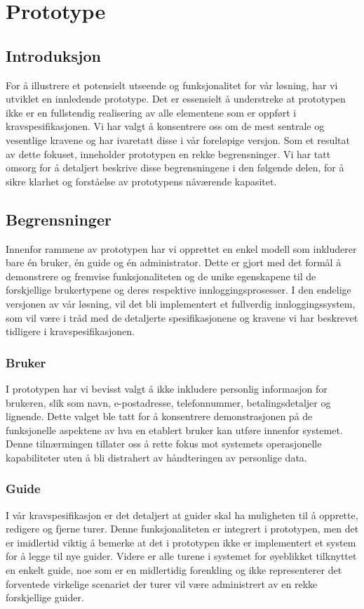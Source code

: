 \documentclass[../doc]{subfiles}
\begin{document}
\section{Prototype}
\subsection{Introduksjon}
For å illustrere et potensielt utseende og funksjonalitet for vår løsning, har vi utviklet en innledende prototype. Det er essensielt å understreke at prototypen ikke er en fullstendig realisering av alle elementene som er oppført i kravspesifikasjonen. Vi har valgt å konsentrere oss om de mest sentrale og vesentlige kravene og har ivaretatt disse i vår foreløpige versjon. Som et resultat av dette fokuset, inneholder prototypen en rekke begrensninger. Vi har tatt omsorg for å detaljert beskrive disse begrensningene i den følgende delen, for å sikre klarhet og forståelse av prototypens nåværende kapasitet.

\subsection{Begrensninger}
Innenfor rammene av prototypen har vi opprettet en enkel modell som inkluderer bare én bruker, én guide og én administrator. Dette er gjort med det formål å demonstrere og fremvise funksjonaliteten og de unike egenskapene til de forskjellige brukertypene og deres respektive innloggingsprosesser. I den endelige versjonen av vår løsning, vil det bli implementert et fullverdig innloggingssystem, som vil være i tråd med de detaljerte spesifikasjonene og kravene vi har beskrevet tidligere i kravspesifikasjonen.

\subsubsection*{Bruker}
I prototypen har vi bevisst valgt å ikke inkludere personlig informasjon for brukeren, slik som navn, e-postadresse, telefonnummer, betalingsdetaljer og lignende. Dette valget ble tatt for å konsentrere demonstrasjonen på de funksjonelle aspektene av hva en etablert bruker kan utføre innenfor systemet. Denne tilnærmingen tillater oss å rette fokus mot systemets operasjonelle kapabiliteter uten å bli distrahert av håndteringen av personlige data.

\subsubsection*{Guide}    
I vår kravspesifikasjon er det detaljert at guider skal ha muligheten til å opprette, redigere og fjerne turer. Denne funksjonaliteten er integrert i prototypen, men det er imidlertid viktig å bemerke at det i prototypen ikke er implementert et system for å legge til nye guider. Videre er alle turene i systemet for øyeblikket tilknyttet en enkelt guide, noe som er en midlertidig forenkling og ikke representerer det forventede virkelige scenariet der turer vil være administrert av en rekke forskjellige guider.
\end{document}
